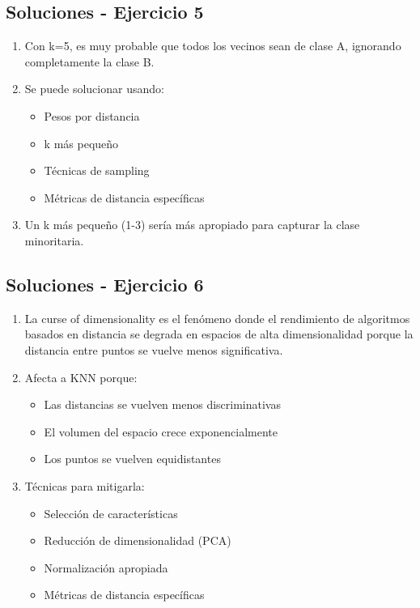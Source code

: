 \documentclass[12pt]{article}
\begin{document}
\subsection{Soluciones - Ejercicio 5}

\begin{enumerate}
    \item Con k=5, es muy probable que todos los vecinos sean de clase A, ignorando completamente la clase B.
    \item Se puede solucionar usando:
    \begin{itemize}
        \item Pesos por distancia
        \item k más pequeño
        \item Técnicas de sampling
        \item Métricas de distancia específicas
    \end{itemize}
    \item Un k más pequeño (1-3) sería más apropiado para capturar la clase minoritaria.
\end{enumerate}

\subsection{Soluciones - Ejercicio 6}

\begin{enumerate}
    \item La curse of dimensionality es el fenómeno donde el rendimiento de algoritmos basados en distancia se degrada en espacios de alta dimensionalidad porque la distancia entre puntos se vuelve menos significativa.
    \item Afecta a KNN porque:
    \begin{itemize}
        \item Las distancias se vuelven menos discriminativas
        \item El volumen del espacio crece exponencialmente
        \item Los puntos se vuelven equidistantes
    \end{itemize}
    \item Técnicas para mitigarla:
    \begin{itemize}
        \item Selección de características
        \item Reducción de dimensionalidad (PCA)
        \item Normalización apropiada
        \item Métricas de distancia específicas
    \end{itemize}
\end{enumerate}
\end{document}
